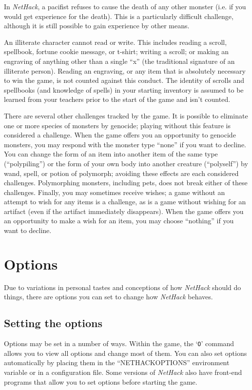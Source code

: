 In {\it NetHack\/}, a pacifist refuses to cause the death of any other monster
(i.e. if you would get experience for the death).  This is a particularly
difficult challenge, although it is still possible to gain experience
by other means.

An illiterate character cannot read or write.  This includes reading
a scroll, spellbook, fortune cookie message, or t-shirt; writing a
scroll; or making an engraving of anything other than a single ``x'' (the
traditional signature of an illiterate person).  Reading an engraving,
or any item that is absolutely necessary to win the game, is not counted
against this conduct.  The identity of scrolls and spellbooks (and
knowledge of spells) in your starting inventory is assumed to be
learned from your teachers prior to the start of the game and isn't
counted.

There are several other challenges tracked by the game.  It is possible
to eliminate one or more species of monsters by genocide; playing without
this feature is considered a challenge.  When the game offers you an
opportunity to genocide monsters, you may respond with the monster type
``none'' if you want to decline.  You can change the form of an item into
another item of the same type (``polypiling'') or the form of your own
body into another creature (``polyself'') by wand, spell, or potion of
polymorph; avoiding these effects are each considered challenges.
Polymorphing monsters, including pets, does not break either of these
challenges.
Finally, you may sometimes receive wishes; a game without an attempt to
wish for any items is a challenge, as is a game without wishing for
an artifact (even if the artifact immediately disappears).  When the
game offers you an opportunity to make a wish for an item, you may
choose ``nothing'' if you want to decline.

\section{Options}

Due to variations in personal tastes and conceptions of how {\it NetHack\/}
should do things, there are options you can set to change how {\it NetHack\/}
behaves.

\subsection*{Setting the options}

Options may be set in a number of ways.  Within the game, the `{\tt O}'
command allows you to view all options and change most of them.
You can also set options automatically by placing them in the
``NETHACKOPTIONS'' environment variable or in a configuration file.
Some versions of {\it NetHack\/} also have front-end programs that allow
you to set options before starting the game.

